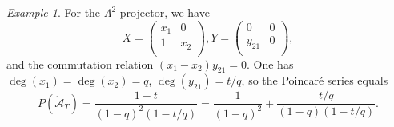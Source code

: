 \documentclass[12pt]{amsart}
\numberwithin{equation}{section}
\theoremstyle{definition}
\theoremstyle{remark}
\newtheorem{example}[theorem]{Example}
\newcommand{\CA}{\mathcal{A}}
\newcommand{\CP}{\mathcal{P}}
\renewcommand{\1}{\mathbf{1}}
\newcommand{\oCA}{\mathring{\CA}}
\newcommand{\fsl}{\mathfrak{sl}}
\begin{document}



\begin{example}

For the $\Lambda^2$ projector, we have
$$
X=\left(\begin{matrix}
x_1 & 0\\
1 & x_2\\
\end{matrix}\right),
Y=\left(\begin{matrix}
0 & 0\\
y_{21} & 0\\
\end{matrix}\right),
$$
and the commutation relation $(x_1-x_2)y_{21}=0$.
One has $\deg(x_1)=\deg(x_2)=q$, $\deg(y_{21})=t/q$, so the Poincar\'e series equals 
$$
P(\oCA_T)=\frac{1-t}{(1-q)^2(1-t/q)}=\frac{1}{(1-q)^2}+\frac{t/q}{(1-q)(1-t/q)}.
$$

\end{example}

\end{document}

